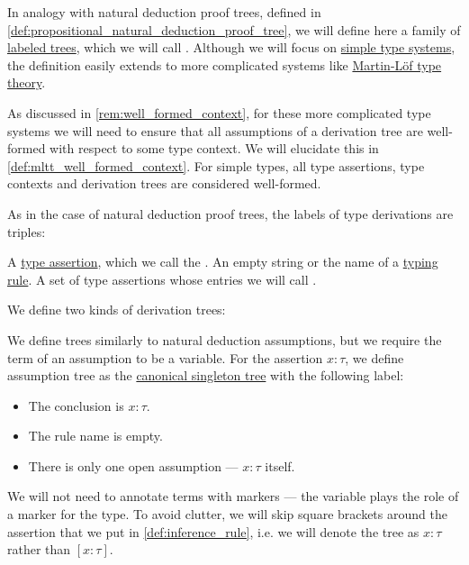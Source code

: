 \begin{definition}\label{def:type_derivation_tree}\mimprovised
  In analogy with natural deduction proof trees, defined in \cref{def:propositional_natural_deduction_proof_tree}, we will define here a family of \hyperref[def:labeled_tree]{labeled trees}, which we will call . Although we will focus on \hyperref[def:simple_type_system]{simple type systems}, the definition easily extends to more complicated systems like \hyperref[def:martin_lof_type_theory]{Martin-L\"of type theory}.

  As discussed in \cref{rem:well_formed_context}, for these more complicated type systems we will need to ensure that all assumptions of a derivation tree are well-formed with respect to some type context. We will elucidate this in \cref{def:mltt_well_formed_context}. For simple types, all type assertions, type contexts and derivation trees are considered well-formed.

  As in the case of natural deduction proof trees, the labels of type derivations are triples:
  \begin{thmenum}[series=def:type_derivation_tree]
     A \hyperref[def:type_assertion]{type assertion}, which we call the .
     An empty string or the name of a \hyperref[def:simple_typing_rule]{typing rule}.
     A set of type assertions whose entries we will call .
  \end{thmenum}

  We define two kinds of derivation trees:
  \begin{thmenum}[resume=def:type_derivation_tree]
     We define  trees similarly to natural deduction assumptions, but we require the term of an assumption to be a variable. For the assertion \( x: \tau \), we define assumption tree as the \hyperref[def:canonical_singleton_tree]{canonical singleton tree} with the following label:
    \begin{itemize}
      \item The conclusion is \( x: \tau \).
      \item The rule name is empty.
      \item There is only one open assumption --- \( x: \tau \) itself.
    \end{itemize}

    We will not need to annotate terms with markers --- the variable plays the role of a marker for the type. To avoid clutter, we will skip square brackets around the assertion that we put in \cref{def:inference_rule}, i.e. we will denote the tree as \( x: \tau \) rather than \( [x: \tau] \).


\end{thmenum}
\end{definition}

